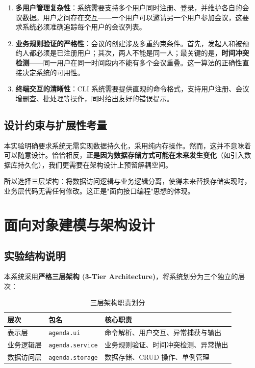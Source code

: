\documentclass[a4paper]{article}
\begin{document}
\begin{enumerate}
    \item \textbf{多用户管理复杂性}：系统需要支持多个用户同时注册、登录，并维护各自的会议数据。用户之间存在交互——一个用户可以邀请另一个用户参加会议，这要求系统必须准确追踪每个用户的会议列表。
    
    \item \textbf{业务规则验证的严格性}：会议的创建涉及多重约束条件。首先，发起人和被预约人都必须是已注册用户；其次，两人不能是同一人；最关键的是，\textbf{时间冲突检测}——同一用户在同一时间段内不能有多个会议重叠。这一算法的正确性直接决定系统的可用性。
    
    \item \textbf{终端交互的清晰性}：CLI 系统需要提供直观的命令格式，支持用户注册、会议增删查、批处理等操作，同时给出友好的错误提示。
\end{enumerate}

\subsection{设计约束与扩展性考量}

本实验明确要求系统无需实现数据持久化，采用纯内存操作。然而，这并不意味着可以随意设计。恰恰相反，\textbf{正是因为数据存储方式可能在未来发生变化}（如引入数据库持久化），我们更需要在架构设计上预留解耦空间。

所以选择三层架构：将数据访问逻辑与业务逻辑分离，使得未来替换存储实现时，业务层代码无需任何修改。这正是"面向接口编程"思想的体现。

\section{面向对象建模与架构设计}

\subsection{实验结构说明}

本系统采用\textbf{严格三层架构 (3-Tier Architecture)}，将系统划分为三个独立的层次：

\begin{table}[H]
\centering
\begin{tabular}{lll}
\toprule
\textbf{层次} & \textbf{包名} & \textbf{核心职责} \\
\midrule
表示层 & \texttt{agenda.ui} & 命令解析、用户交互、异常捕获与输出 \\
业务逻辑层 & \texttt{agenda.service} & 业务规则验证、时间冲突检测、异常抛出 \\
数据访问层 & \texttt{agenda.storage} & 数据存储、CRUD 操作、单例管理 \\
\bottomrule
\end{tabular}
\caption{三层架构职责划分}
\end{table}
\end{document}
